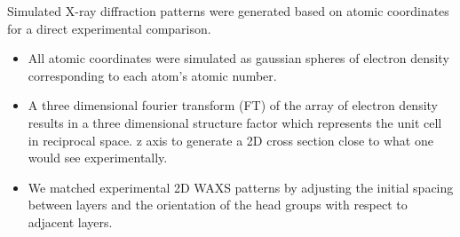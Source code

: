 \documentclass{article}
\newcommand{\angstrom}{\textup{\AA}}
\begin{document}
  
  

  Simulated X-ray diffraction patterns were generated based on atomic
  coordinates for a direct experimental comparison.
  \begin{itemize}
    \item All atomic coordinates were simulated as gaussian spheres of electron
    density corresponding to each atom's atomic number.
    \item A three dimensional fourier transform (FT) of the array of electron 
    density results in a three dimensional structure factor which represents
    the unit cell in reciprocal space.
    z axis to generate a 2D cross section close to what one would see 
    experimentally.
    \item We matched experimental 2D WAXS patterns by adjusting the initial 
    spacing between layers and the orientation of the head groups with respect
    to adjacent layers.
  \end{itemize}
  
\end{document}
